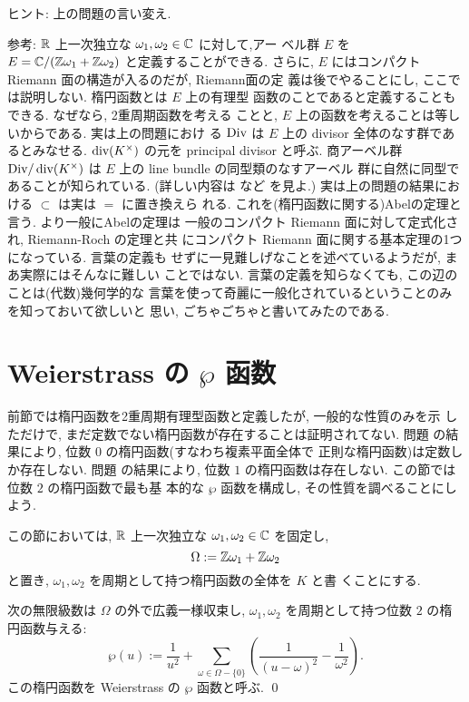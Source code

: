 \documentclass[12pt,twoside]{jarticle}
\def\setminus{-}
\def\pe{\wp}
\def\Div{{\text{\rm Div}}}
\def\Z{{\Bbb Z}} %
\def\R{{\Bbb R}} %
\def\C{{\Bbb C}} %
\def\div{\mathop{\text{\rm div}}\nolimits}
\begin{document}
\noindent ヒント: 上の問題の言い変え.

\medskip 

\noindent 参考: $\R$ 上一次独立な $\omega_1,\omega_2\in\C$ に対して,アー
ベル群 $E$ を $E = \C/(\Z\omega_1+\Z\omega_2)$ と定義することができる. 
さらに, $E$ にはコンパクト Riemann 面の構造が入るのだが, Riemann面の定
義は後でやることにし, ここでは説明しない. 楕円函数とは $E$ 上の有理型
函数のことであると定義することもできる. なぜなら, 2重周期函数を考える
ことと, $E$ 上の函数を考えることは等しいからである. 実は上の問題におけ
る $\Div$ は $E$ 上の divisor 全体のなす群であるとみなせる. %
$\div(K^{\times})$ の元を principal divisor と呼ぶ. 商アーベル群 %
$\Div/\div(K^{\times})$ は $E$ 上の line bundle の同型類のなすアーベル
群に自然に同型であることが知られている. (詳しい内容は \cite{Gun} など
を見よ.)  実は上の問題の結果における $\subset$ は実は $=$ に置き換えら
れる. これを(楕円函数に関する)Abelの定理と言う. より一般にAbelの定理は
一般のコンパクト Riemann 面に対して定式化され, Riemann-Roch の定理と共
にコンパクト Riemann 面に関する基本定理の1つになっている. 言葉の定義も
せずに一見難しげなことを述べているようだが, まあ実際にはそんなに難しい
ことではない. 言葉の定義を知らなくても, この辺のことは(代数)幾何学的な
言葉を使って奇麗に一般化されているということのみを知っておいて欲しいと
思い, ごちゃごちゃと書いてみたのである. 


\section{Weierstrass の $\pe$ 函数}

前節では楕円函数を2重周期有理型函数と定義したが, 一般的な性質のみを示
しただけで, まだ定数でない楕円函数が存在することは証明されてない. 問題
 の結果により, 位数 $0$ の楕円函数(すなわち複素平面全体で
正則な楕円函数)は定数しか存在しない. 問題  の結果により, 
位数 $1$ の楕円函数は存在しない. この節では位数 $2$ の楕円函数で最も基
本的な $\pe$ 函数を構成し, その性質を調べることにしよう.

\medskip

この節においては, $\R$ 上一次独立な $\omega_1,\omega_2\in\C$ を固定し,
\[
  \Omega := \Z \omega_1 + \Z \omega_2
\] %
と置き, $\omega_1,\omega_2$ を周期として持つ楕円函数の全体を $K$ と書
くことにする.

\begin{question}[$\pe$ 函数の定義]\label{q:pe1}\qstar{*}
  次の無限級数は $\Omega$ の外で広義一様収束し,
  $\omega_1,\omega_2$ を周期として持つ位数 $2$ の楕円函数与える:
  \[
    \pe(u) := 
    \frac{1}{u^2} +
    \sum_{\omega\in\Omega\setminus\{0\}}
    \left(\frac{1}{(u-\omega)^2} - \frac{1}{\omega^2}\right).
  \]
  この楕円函数を Weierstrass の $\pe$ 函数と呼ぶ. \qed
\end{question}
\end{document}
